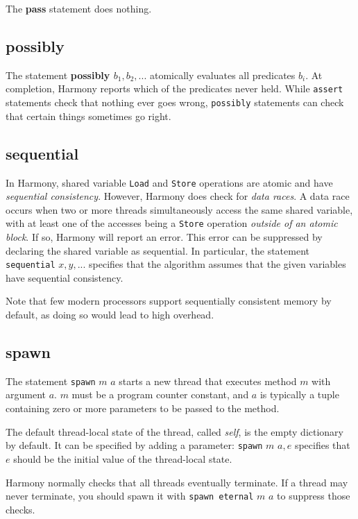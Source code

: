 \documentclass{report}
\begin{document}
The \textbf{pass} statement does nothing.

\subsection*{\textbf{possibly}}

The statement \textbf{possibly $b_1, b_2, ...$} atomically evaluates all
predicates $b_i$.
At completion, Harmony reports which of the predicates never held.
While \texttt{assert} statements check that nothing ever goes wrong,
\texttt{possibly} statements can check that certain things sometimes
go right.

\subsection*{\textbf{sequential}}

In Harmony, shared variable \texttt{Load} and \texttt{Store} operations
are atomic and have \emph{sequential consistency}.
However, Harmony does check for \emph{data races}.  A data race occurs
when two or more threads simultaneously access the same shared variable,
with at least one of the accesses being a \texttt{Store} operation
\emph{outside of an atomic block}.
If so, Harmony will report an error.  This error can be suppressed by
declaring the shared variable as sequential.  In particular, the statement
\texttt{sequential} $x, y, ...$ specifies that the algorithm assumes
that the given variables have sequential consistency.

Note that few modern processors support sequentially consistent memory
by default, as doing so would lead to high overhead.

\subsection*{\textbf{spawn}}

The statement \texttt{spawn} $m$ $a$ starts a new thread that executes
method $m$ with argument $a$. $m$ must be a program counter constant,
and $a$ is typically a tuple containing
zero or more parameters to be passed to the method.

The default thread-local state of the thread, called \textit{self},
is the empty dictionary by default.  It can be specified by adding
a parameter: \texttt{spawn} $m$ $a, e$ specifies that $e$ should be
the initial value of the thread-local state.

Harmony normally checks that all threads eventually terminate.
If a thread may never terminate, you should spawn it with
\texttt{spawn eternal} $m$ $a$ to suppress those checks.
\end{document}

